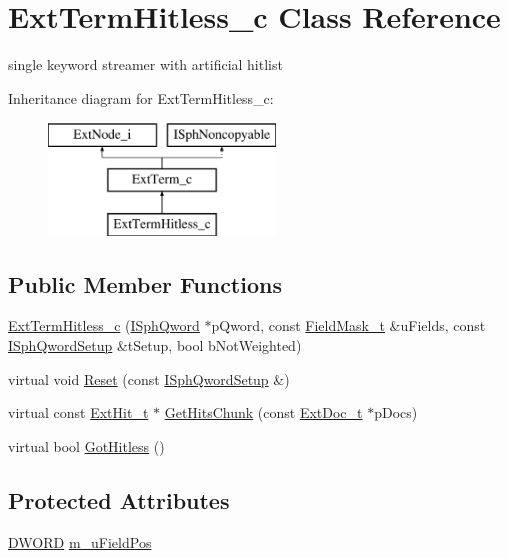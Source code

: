 \hypertarget{classExtTermHitless__c}{\section{Ext\-Term\-Hitless\-\_\-c Class Reference}
\label{classExtTermHitless__c}
}


single keyword streamer with artificial hitlist  


Inheritance diagram for Ext\-Term\-Hitless\-\_\-c\-:\begin{figure}[H]
\begin{center}
\leavevmode
\includegraphics[height=3.000000cm]{classExtTermHitless__c}
\end{center}
\end{figure}
\subsection*{Public Member Functions}
\begin{DoxyCompactItemize}
\item 
\hyperlink{classExtTermHitless__c_ad7e3efa91d7975b19d04a65fafce086b}{Ext\-Term\-Hitless\-\_\-c} (\hyperlink{classISphQword}{I\-Sph\-Qword} $\ast$p\-Qword, const \hyperlink{structFieldMask__t}{Field\-Mask\-\_\-t} \&u\-Fields, const \hyperlink{classISphQwordSetup}{I\-Sph\-Qword\-Setup} \&t\-Setup, bool b\-Not\-Weighted)
\item 
virtual void \hyperlink{classExtTermHitless__c_ac1f90eb86a88080a971038c89fdd8748}{Reset} (const \hyperlink{classISphQwordSetup}{I\-Sph\-Qword\-Setup} \&)
\item 
virtual const \hyperlink{structExtHit__t}{Ext\-Hit\-\_\-t} $\ast$ \hyperlink{classExtTermHitless__c_a31c1105552c9ef370a10a9bb0081f8d1}{Get\-Hits\-Chunk} (const \hyperlink{structExtDoc__t}{Ext\-Doc\-\_\-t} $\ast$p\-Docs)
\item 
virtual bool \hyperlink{classExtTermHitless__c_aa1f5e02e68a8e2050b636aef14e5a81a}{Got\-Hitless} ()
\end{DoxyCompactItemize}
\subsection*{Protected Attributes}
\begin{DoxyCompactItemize}
\item 
\hyperlink{sphinxstd_8h_a798af1e30bc65f319c1a246cecf59e39}{D\-W\-O\-R\-D} \hyperlink{classExtTermHitless__c_a7320fddf47fa2a60e8fa7a8e34bbb85b}{m\-\_\-u\-Field\-Pos}
\end{DoxyCompactItemize}
